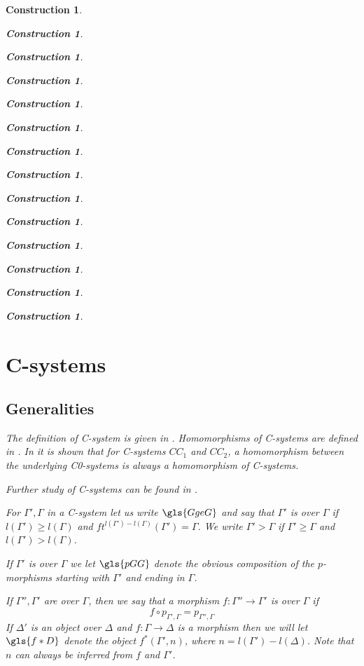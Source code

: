 \documentclass[onecolumn,12pt]{amsart}
\numberwithin{proposition}{subsection}
\newtheorem{construction}[proposition]{Construction}
\newcommand{\sr}{\rightarrow}
\begin{document}
\begin{construction}
\begin{construction}
\begin{construction}
\begin{construction}
\begin{construction}
\begin{construction}
\begin{construction}
\begin{construction}
\begin{construction}
\begin{construction}
\begin{construction}
\begin{construction}
\begin{construction}
\begin{construction}
\section{C-systems}\label{C-systems}

\subsection{Generalities}
\label{onCsystems}
%
The definition of \emph{C-system} is given in \cite[Def. 2.1,
  2.3]{Csubsystems}.  \emph{Homomorphisms} of C-systems are defined in \cite[Def. 3.1,
  p 1188]{Cfromauniverse}. In \cite[Lemma 3.4, p.~1190]{Cfromauniverse} it is
shown that for C-systems $CC_1$ and $CC_2$, a homomorphism between the underlying
C0-systems is always a homomorphism of C-systems.

Further study of C-systems can be found in \cite[Sec. 2, pp. 1048-1064]{fromunivwithPiI}. 

For $\Gamma',\Gamma$ in a C-system let us write $\gls{GgeG}$ and say
that $\Gamma'$ is \emph{over} $\Gamma$ if $l(\Gamma')\ge l(\Gamma)$ and
$ft^{l(\Gamma')-l(\Gamma)}(\Gamma')=\Gamma$. We write $\Gamma'>\Gamma$ if
$\Gamma'\ge \Gamma$ and $l(\Gamma')>l(\Gamma)$.

If $\Gamma'$ is over $\Gamma$ we let $\gls{pGG}$ denote the
obvious composition of the $p$-morphisms starting with $\Gamma'$ and ending in
$\Gamma$.

If $\Gamma'',\Gamma'$ are over $\Gamma$, then we say that a morphism
$f:\Gamma''\sr \Gamma'$ is \emph{over} $\Gamma$  if
%
$$f\circ p_{\Gamma',\Gamma}=p_{\Gamma'',\Gamma}$$
%
If $\Delta'$ is an object over $\Delta$ and $f:\Gamma\sr \Delta$ is a morphism
then we will let $\gls{f*D}$ denote the object $f^*(\Gamma',n)$, where
$n=l(\Gamma')-l(\Delta)$. Note that $n$ can always be inferred from $f$ and
$\Gamma'$.


\end{construction}
\end{construction}
\end{construction}
\end{construction}
\end{construction}
\end{construction}
\end{construction}
\end{construction}
\end{construction}
\end{construction}
\end{construction}
\end{construction}
\end{construction}
\end{construction}
\end{document}
